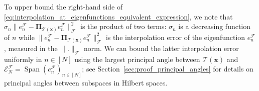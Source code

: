 \documentclass[twoside,11pt]{book}
\newtheorem{theorem}{Theorem}
\numberwithin{theorem}{chapter}
\numberwithin{definition}{chapter}
\numberwithin{proposition}{chapter}
\numberwithin{corollary}{chapter}
\numberwithin{example}{chapter}
\numberwithin{lemma}{chapter}
\numberwithin{assumption}{chapter}
\numberwithin{equation}{chapter}
\numberwithin{figure}{chapter}
\DeclareMathOperator{\Span}{\mathrm{Span}}
\DeclareMathOperator{\F}{\mathcal{F}}
\begin{document}
To upper bound the right-hand side of \eqref{eq:interpolation_at_eigenfunctions_equivalent_expression}, we note that $\sigma_{n} \|e_{n}^{\F} - \bm{\Pi}_{\mathcal{T}(\bm{x})} e_{n}^{\F}\|_{\mathcal{F}}^{2}$ is the product of two terms: $\sigma_{n}$ is a decreasing function of $n$ while $\|e_{n}^{\F} - \bm{\Pi}_{\mathcal{T}(\bm{x})} e_{n}^{\F}\|_{\mathcal{F}}^{2}$ is the interpolation error of the eigenfunction $e_{n}^{\mathcal{F}}$, measured in the $\|.\|_{\mathcal{F}}$ norm.
We can bound the latter interpolation error uniformly in $n\in [N]$ using the largest principal angle between $\mathcal{T}(\bm{x})$ and $\mathcal{E}^{\mathcal{F}}_{N} = \Span(e_{n}^{\mathcal{F}})_{ n \in [N]}$; see Section~\ref{sec:proof_principal_angles} for details on principal angles between subspaces in Hilbert spaces. 
\end{document}
